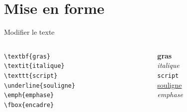 \documentclass[handout]{beamer}
\begin{document}
\section{Mise en forme}
\begin{frame}{Modifier le texte}
\begin{columns}[c]
	
	\begin{column}{0.5\textwidth}	
	\texttt{\textbackslash textbf\{gras\}}\\[11pt]
	\texttt{\textbackslash textit\{italique\}}\\[11pt]
	\texttt{\textbackslash texttt\{script\}}\\[11pt]
	\texttt{\textbackslash underline\{souligne\}}\\[11pt]
	\texttt{\textbackslash emph\{emphase\}}\\[11pt]
	\texttt{\textbackslash fbox\{encadre\}}
	\end{column}

	\begin{column}{0.5\textwidth}
	\textbf{gras}\\[11pt]
	\textit{italique}\\[11pt]
	\texttt{script}\\[11pt]
	\underline{souligne}\\[11pt]
	\emph{emphase}\\[11pt]
	\end{column}
\end{columns}

\end{frame}
\end{document}
